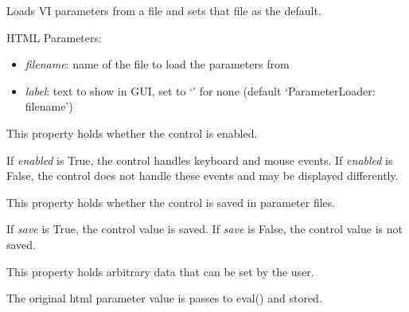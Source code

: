 \documentclass[letterpaper,10pt,english]{sphinxmanual}
\begin{document}

\begin{fulllineitems}
\label{api:controls.ParameterLoader}
Loads VI parameters from a file and sets that file as the default.

HTML Parameters:
\begin{itemize}
\item {} 
\emph{filename}: name of the file to load the parameters from

\item {} 
\emph{label}: text to show in GUI, set to `' for none (default `ParameterLoader: filename')

\end{itemize}

\begin{fulllineitems}
\label{api:controls.ParameterLoader.enabled}
This property holds whether the control is enabled.

If \emph{enabled} is True, the control handles keyboard and mouse events.
If \emph{enabled} is False, the control does not handle these events and may
be displayed differently.

\end{fulllineitems}


\begin{fulllineitems}
\label{api:controls.ParameterLoader.save}
This property holds whether the control is saved in parameter files.

If \emph{save} is True, the control value is saved.
If \emph{save} is False, the control value is not saved.

\end{fulllineitems}


\begin{fulllineitems}
\label{api:controls.ParameterLoader.user}
This property holds arbitrary data that can be set by the user.

The original html parameter value is passes to eval() and stored.

\end{fulllineitems}


\end{fulllineitems}
\end{document}
